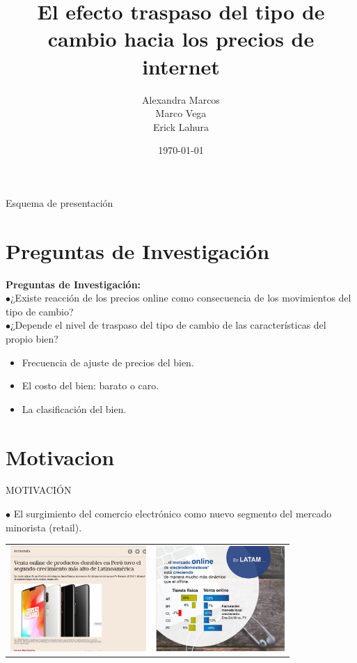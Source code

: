 \documentclass[xcolor=dvipsnames]{beamer}
\title[Presentaci\'on]{El efecto traspaso del tipo de cambio hacia los precios de internet}
\author[]{Alexandra Marcos \\ Marco Vega \\Erick Lahura}
\institute[PUCP BCRP]{Pontificia Universidad Cat\'olica del Per\'u \\ Banco Central de Reserva del Per\'u}
\date{\today}
\begin{document}
\begin{frame}
\titlepage
\end{frame}

\begin{frame}{Esquema de presentaci\'on}
  \tableofcontents
\end{frame}

\section{Preguntas de Investigaci\'on}
\begin{frame}
\textbf{Preguntas de Investigaci\'on: }\\
$\bullet$¿Existe reacci\'on de los precios online como consecuencia de los movimientos del tipo de cambio? \\
$\bullet$¿Depende el nivel de traspaso del tipo de cambio de las caracter\'isticas del propio bien?
\begin{itemize}
	\item Frecuencia de ajuste de precios del bien.
	\item El costo del bien: barato o caro.
	\item La clasificaci\'on del bien.
\end{itemize}
\end{frame}

\section{Motivacion}
\begin{frame}
MOTIVACI\'ON
\end{frame}

\begin{frame}
$\bullet$ El surgimiento del comercio electr\'onico como nuevo segmento del mercado minorista (retail).
\begin{table}[!h]
\begin{tabular}{cc}
\includegraphics[height=3.99cm, scale = 0.7]{N1.png} &
\includegraphics[height=3.99cm, scale =1.0]{N2.png} \\
\end{tabular}
\end{table}
\end{frame}
\end{document}
